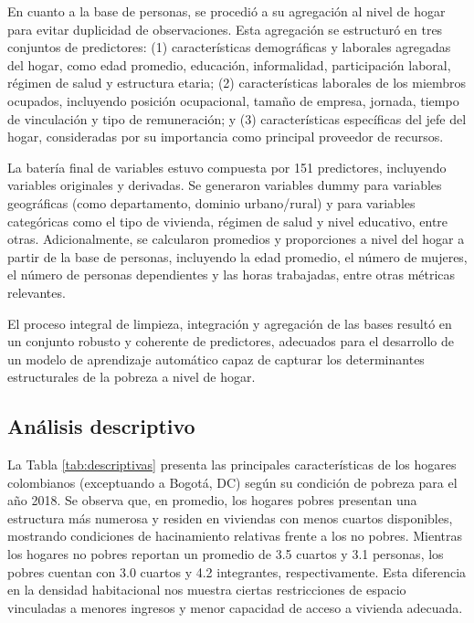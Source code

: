 En cuanto a la base de personas, se procedió a su agregación al nivel de hogar para evitar duplicidad de observaciones. Esta agregación se estructuró en tres conjuntos de predictores: (1) características demográficas y laborales agregadas del hogar, como edad promedio, educación, informalidad, participación laboral, régimen de salud y estructura etaria; (2) características laborales de los miembros ocupados, incluyendo posición ocupacional, tamaño de empresa, jornada, tiempo de vinculación y tipo de remuneración; y (3) características específicas del jefe del hogar, consideradas por su importancia como principal proveedor de recursos. 


La batería final de variables estuvo compuesta por 151 predictores, incluyendo variables originales y derivadas. Se generaron variables dummy para  variables geográficas (como departamento, dominio urbano/rural) y para variables categóricas como el tipo de vivienda, régimen de salud y nivel educativo, entre otras. Adicionalmente, se calcularon promedios y proporciones a nivel del hogar a partir de la base de personas, incluyendo la edad promedio, el número de mujeres, el número de personas dependientes y las horas trabajadas, entre otras métricas relevantes.

El proceso integral de limpieza, integración y agregación de las bases resultó en un conjunto robusto y coherente de predictores, adecuados para el desarrollo de un modelo de aprendizaje automático capaz de capturar los determinantes estructurales de la pobreza a nivel de hogar. 



\subsection{Análisis descriptivo}
La Tabla \ref{tab:descriptivas}  presenta las principales características de los hogares colombianos (exceptuando a Bogotá, DC) según su condición de pobreza para el año 2018. Se observa que, en promedio, los hogares pobres presentan una estructura más numerosa y residen en viviendas con menos cuartos disponibles, mostrando condiciones de hacinamiento relativas frente a los no pobres. Mientras los hogares no pobres reportan un promedio de 3.5 cuartos y 3.1 personas, los pobres cuentan con 3.0 cuartos y 4.2 integrantes, respectivamente. Esta diferencia en la densidad habitacional nos muestra ciertas restricciones de espacio vinculadas a menores ingresos y menor capacidad de acceso a vivienda adecuada.

